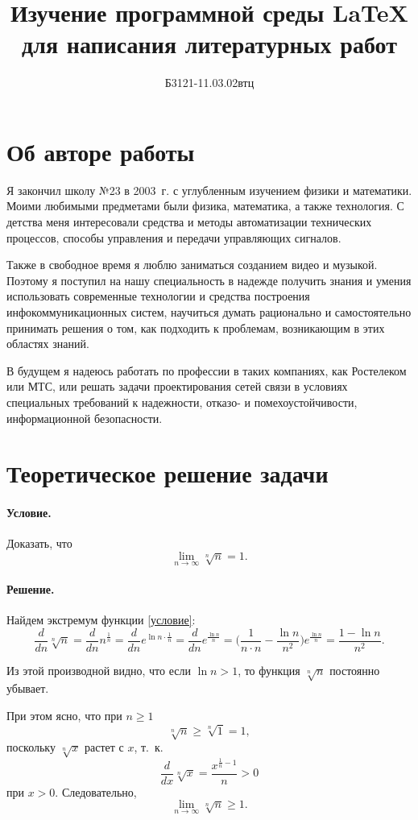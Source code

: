 \documentclass[labwork]{fefudoc}
\author{Б3121-11.03.02втц}{Сидоров Иван Петрович}
\title{Изучение программной среды \LaTeX{} для написания литературных работ}
\begin{document}
\frontpage
\tableofcontents

\section{Об авторе работы}
Я закончил школу №23 в 2003~г. с углубленным изучением физики и математики. Моими любимыми предметами были физика, математика, а также технология. С детства меня интересовали средства и методы автоматизации технических процессов, способы управления и передачи управляющих сигналов.

Также в свободное время я люблю заниматься созданием видео и музыкой. Поэтому я поступил на нашу специальность в надежде получить знания и умения использовать современные технологии и средства построения инфокоммуникационных систем, научиться думать рационально и самостоятельно принимать решения о том, как подходить к проблемам, возникающим в этих областях знаний.

В будущем я надеюсь работать по профессии в таких компаниях, как Ростелеком или МТС, или решать задачи проектирования сетей связи в условиях специальных требований к надежности, отказо- и помехоустойчивости, информационной безопасности.

\section{Теоретическое решение задачи}
\paragraph{Условие.} Доказать, что
\begin{equation}\label{условие}
\lim_{n \to \infty} \sqrt[n]{n} = 1.
\end{equation}
\paragraph{Решение.} Найдем экстремум функции \eqref{условие}:
$$
\frac{d}{dn} \sqrt[n]{n}
 = \frac{d}{dn} n^\frac{1}{n}
 = \frac{d}{dn} e^{\ln n \cdot \frac{1}{n}}
 = \frac{d}{dn} e^{\frac{\ln n}{n}}
 = \Big(\frac{1}{n \cdot n} - \frac{\ln n}{n^2}\Big) e^\frac{\ln n}{n}
 = \frac{1 - \ln n}{n^2}.
$$

Из этой производной видно, что если $\ln n > 1$, то функция $\sqrt[n]{n}$ постоянно убывает.

При этом ясно, что при $n \geq 1$
$$
\sqrt[n]{n} \geq \sqrt[n]{1} = 1,
$$
поскольку $\sqrt[n]{x}$ растет с $x$, т.~к. $$\frac{d}{dx}\sqrt[n]{x} = \frac{x^{\frac{1}{n} - 1}}{n} > 0$$ при $x > 0$.
Следовательно,
\begin{equation}\label{нижняя граница}
\lim_{n\to\infty}\sqrt[n]{n} \geq 1.
\end{equation}
\end{document}
